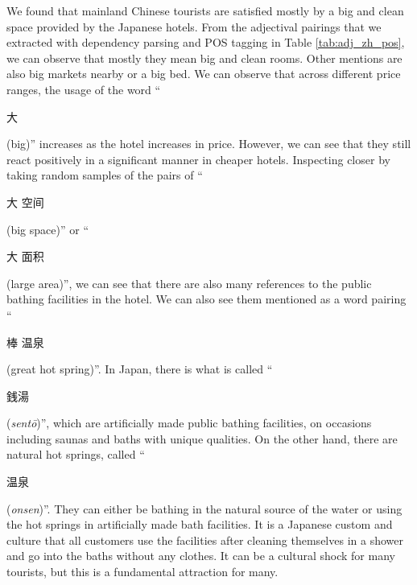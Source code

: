 \documentclass[smallextended,natbib]{svjour3}       %
\begin{document}
    We found that mainland Chinese tourists are satisfied mostly by a big and clean space provided by the Japanese hotels. From the adjectival pairings that we extracted with dependency parsing and POS tagging in Table \ref{tab:adj_zh_pos}, we can observe that mostly they mean big and clean rooms. Other mentions are also big markets nearby or a big bed. We can observe that across different price ranges, the usage of the word ``\begin{CJK}{UTF8}{gbsn}大\end{CJK} (big)'' increases as the hotel increases in price. However, we can see that they still react positively in a significant manner in cheaper hotels. Inspecting closer by taking random samples of the pairs of ``\begin{CJK}{UTF8}{gbsn}大 空间\end{CJK} (big space)'' or ``\begin{CJK}{UTF8}{gbsn}大 面积\end{CJK} (large area)'', we can see that there are also many references to the public bathing facilities in the hotel. We can also see them mentioned as a word pairing ``\begin{CJK}{UTF8}{gbsn}棒 温泉\end{CJK} (great hot spring)''. In Japan, there is what is called ``\begin{CJK}{UTF8}{min}銭湯\end{CJK} (\textit{sent\=o})'', which are artificially made public bathing facilities, on occasions including saunas and baths with unique qualities. On the other hand, there are natural hot springs, called ``\begin{CJK}{UTF8}{gbsn}温泉\end{CJK} (\textit{onsen})''. They can either be bathing in the natural source of the water or using the hot springs in artificially made bath facilities. It is a Japanese custom and culture that all customers use the facilities after cleaning themselves in a shower and go into the baths without any clothes. It can be a cultural shock for many tourists, but this is a fundamental attraction for many. 
\end{document}
